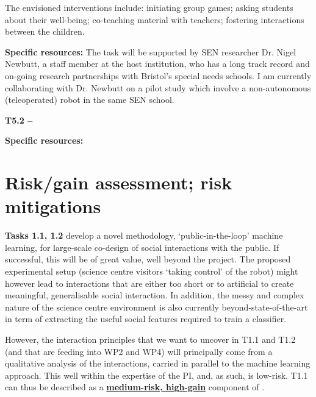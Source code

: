 The envisioned interventions include: initiating group games; asking students
about their well-being; co-teaching material with teachers; fostering
interactions between the children.

\textbf{Specific resources:} The task will be supported by SEN researcher Dr.
Nigel Newbutt, a staff member at the host institution, who has a long track
record and on-going research partnerships with Bristol's special needs schools.
I am currently collaborating with Dr. Newbutt on a pilot study which involve a
non-autonomous (teleoperated) robot in the same SEN school.


\textbf{T5.2 -- }

\textbf{Specific resources:}

\pagebreak



\section{Risk/gain assessment; risk mitigations}\label{risks}

\textbf{Tasks 1.1, 1.2} develop a novel methodology, `public-in-the-loop' machine
learning, for large-scale co-design of social interactions with the public. If
successful, this will be of great value, well beyond the project. The
proposed experimental setup (science centre visitors `taking control' of the robot)
might however lead to interactions that are either too short or to artificial to
create meaningful, generalisable social interaction. In addition, the messy and
complex nature of the science centre environment is also currently beyond-state-of-the-art
in term of extracting the useful social features required to train a classifier.

However, the interaction principles that we want to uncover in T1.1 and T1.2
(and that are feeding into WP2 and WP4) will principally come from a qualitative
analysis of the interactions, carried in parallel to the machine learning
approach. This well within the expertise of the PI, and, as such, is low-risk.
T1.1 can thus be described as a \ul{\bf medium-risk, high-gain} component of
\project.

